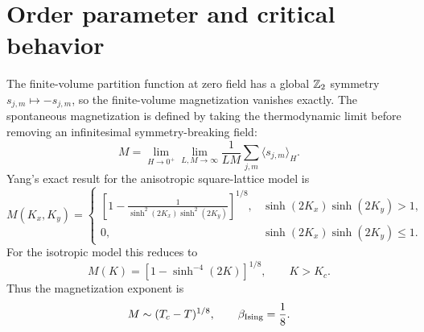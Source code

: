 \section{Order parameter and critical behavior}
\label{sec:2d-classical-ising-order-parameter-critical-behavior}

The finite-volume partition function at zero field has a global $\mathbb{Z}_2$ symmetry
$s_{j,m}\mapsto -s_{j,m}$, so the finite-volume magnetization vanishes exactly.
The spontaneous magnetization is defined by taking the thermodynamic limit before
removing an infinitesimal symmetry-breaking field:
\begin{equation}
\label{eq:2d-classical-ising-spontaneous-magnetization-definition}
    M
    =
    \lim_{H\to0^+}\lim_{L,M\to\infty}
    \frac{1}{LM}\sum_{j,m}\langle s_{j,m}\rangle_H .
\end{equation}
Yang's exact result for the anisotropic square-lattice model is
\begin{equation}
\label{eq:2d-classical-ising-yang-magnetization}
    M(K_x,K_y)
    =
    \begin{cases}
    \displaystyle
    \left[
        1-\frac{1}{\sinh^2(2K_x)\sinh^2(2K_y)}
    \right]^{1/8},
    &
    \sinh(2K_x)\sinh(2K_y)>1,\\[12pt]
    0,
    &
    \sinh(2K_x)\sinh(2K_y)\leq1 .
    \end{cases}
\end{equation}
For the isotropic model this reduces to
\begin{equation}
\label{eq:2d-classical-ising-isotropic-magnetization}
    M(K)
    =
    \left[1-\sinh^{-4}(2K)\right]^{1/8},
    \qquad
    K>K_c .
\end{equation}
Thus the magnetization exponent is
\begin{equation}
\label{eq:2d-classical-ising-beta-exponent}
    M\sim (T_c-T)^{1/8},
    \qquad
    \beta_{\rm Ising}=\frac18 .
\end{equation}

